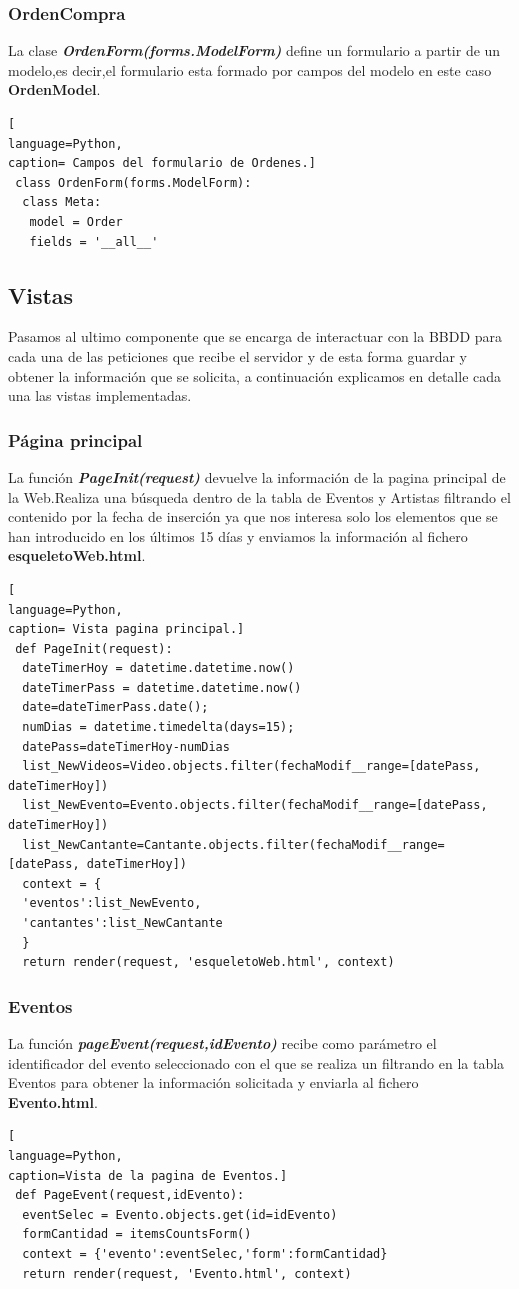 \subsubsection*{OrdenCompra}
La clase \textit{\textbf{OrdenForm(forms.ModelForm)}} define un formulario a partir de un modelo,es decir,el formulario esta formado por campos del modelo en este caso \textbf{OrdenModel}.
\begin{lstlisting}[
language=Python,
caption= Campos del formulario de Ordenes.]
 class OrdenForm(forms.ModelForm):
  class Meta:
   model = Order
   fields = '__all__'
\end{lstlisting}
\subsection{Vistas}
Pasamos al ultimo componente que se encarga de interactuar con la BBDD para cada una de las peticiones que recibe el servidor y de esta forma guardar y obtener la información que se solicita, a continuación explicamos en detalle cada una las vistas implementadas.
\subsubsection*{Página principal}
La función \textit{\textbf{PageInit(request)}} devuelve la información de la pagina principal de la Web.Realiza una búsqueda dentro de la tabla de Eventos y Artistas  filtrando el contenido por la fecha de inserción ya que nos interesa solo los elementos que se han introducido en los últimos 15 días y enviamos la información al fichero \textbf{esqueletoWeb.html}.
\begin{lstlisting}[
language=Python,
caption= Vista pagina principal.]
 def PageInit(request):
  dateTimerHoy = datetime.datetime.now()
  dateTimerPass = datetime.datetime.now()
  date=dateTimerPass.date();
  numDias = datetime.timedelta(days=15);
  datePass=dateTimerHoy-numDias
  list_NewVideos=Video.objects.filter(fechaModif__range=[datePass, dateTimerHoy])
  list_NewEvento=Evento.objects.filter(fechaModif__range=[datePass, dateTimerHoy])
  list_NewCantante=Cantante.objects.filter(fechaModif__range=[datePass, dateTimerHoy])
  context = {
  'eventos':list_NewEvento,
  'cantantes':list_NewCantante
  }
  return render(request, 'esqueletoWeb.html', context) 
\end{lstlisting} 
\subsubsection*{Eventos}
La función \textbf{\textit{pageEvent(request,idEvento)}} recibe como parámetro el identificador del evento seleccionado con el que se realiza un filtrando en la tabla Eventos para obtener la información solicitada y enviarla  al fichero \textbf{Evento.html}.
\begin{lstlisting}[
language=Python,
caption=Vista de la pagina de Eventos.]
 def PageEvent(request,idEvento):
  eventSelec = Evento.objects.get(id=idEvento)
  formCantidad = itemsCountsForm()
  context = {'evento':eventSelec,'form':formCantidad}
  return render(request, 'Evento.html', context)
\end{lstlisting}
